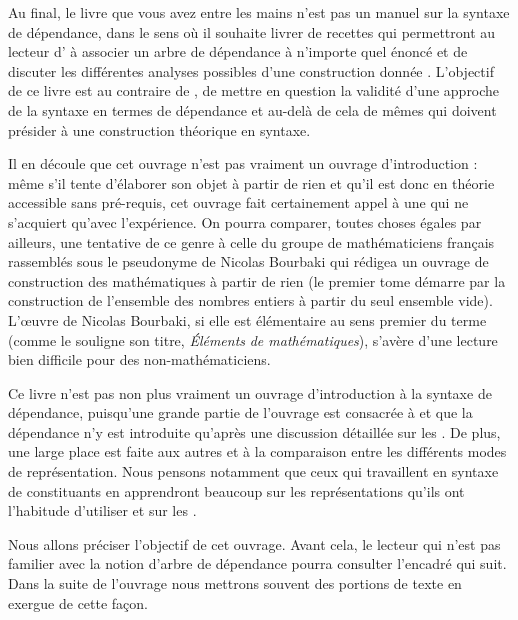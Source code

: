 Au final, le livre que vous avez entre les mains n’est pas un manuel sur la syntaxe de dépendance, dans le sens où il  souhaite  livrer de recettes qui permettront au lecteur d’ à associer un arbre de dépendance à n’importe quel énoncé et de discuter les différentes analyses possibles d’une construction donnée . L’objectif de ce livre est au contraire de  , de mettre en question la validité d’une approche de la syntaxe en termes de dépendance et au-delà de cela de  mêmes qui doivent présider à une construction théorique en syntaxe.

Il en découle que cet ouvrage n’est pas vraiment un ouvrage d’introduction : même s’il tente d’élaborer son objet à partir de rien et qu’il est donc en théorie accessible sans pré-requis, cet ouvrage fait certainement appel à une  qui ne s’acquiert qu’avec l’expérience. On pourra comparer, toutes choses égales par ailleurs, une tentative de ce genre à celle du groupe de mathématiciens français rassemblés sous le pseudonyme de Nicolas Bourbaki qui rédigea un ouvrage de construction des mathématiques à partir de rien (le premier tome démarre par la construction de l'ensemble des nombres entiers à partir du seul ensemble vide). L’œuvre de Nicolas Bourbaki, si elle est élémentaire au sens premier du terme (comme le souligne son titre, \textit{Éléments} \textit{de mathématiques}), s’avère d’une lecture bien difficile pour des non-mathématiciens.

Ce livre n’est pas non plus vraiment un ouvrage d’introduction à la syntaxe de dépendance, puisqu’une grande partie de l’ouvrage est consacrée à    et que la dépendance n’y est introduite qu’après une discussion détaillée sur les . De plus, une large place est faite aux autres   et à la comparaison entre les différents modes de représentation. Nous pensons notamment que ceux qui travaillent en syntaxe de constituants en apprendront beaucoup sur les représentations qu’ils ont l’habitude d’utiliser et sur les .

Nous allons préciser l’objectif de cet ouvrage. Avant cela, le lecteur qui n’est pas familier avec la notion d’arbre de dépendance pourra consulter l’encadré qui suit. Dans la suite de l’ouvrage nous mettrons souvent des portions de texte en exergue de cette façon.


